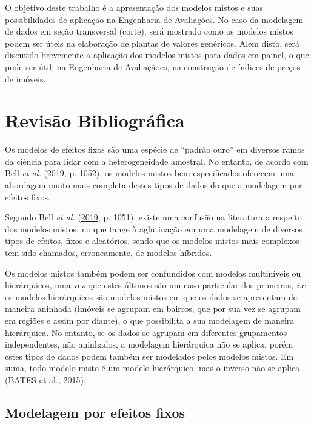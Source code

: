 \documentclass[
  a4paper, 11pt]{article}
\begin{document}
O objetivo deste trabalho é a apresentação dos modelos mistos e suas
possibilidades de aplicação na Engenharia de Avaliações. No caso da
modelagem de dados em seção transversal (corte), será mostrado como os
modelos mistos podem ser úteis na elaboração de plantas de valores
genéricos. Além disto, será discutido brevemente a aplicação dos modelos
mistos para dados em painel, o que pode ser útil, na Engenharia de
Avaliaçãoes, na construção de índices de preços de imóveis.

\hypertarget{revisuxe3o-bibliogruxe1fica}{%
\section{Revisão Bibliográfica}\label{revisuxe3o-bibliogruxe1fica}}

Os modelos de efeitos fixos são uma espécie de ``padrão ouro'' em
diversos ramos da ciência para lidar com a heterogeneidade amostral. No
entanto, de acordo com Bell \emph{et al.}
(\protect\hyperlink{ref-bell2019}{2019}, p. 1052), os modelos mistos bem
especificados oferecem uma abordagem muito mais completa destes tipos de
dados do que a modelagem por efeitos fixos.

Segundo Bell \emph{et al.} (\protect\hyperlink{ref-bell2019}{2019}, p.
1051), existe uma confusão na literatura a respeito dos modelos mistos,
no que tange à aglutinação em uma modelagem de diversos tipos de
efeitos, fixos e aleatórios, sendo que os modelos mistos mais complexos
tem sido chamados, erroneamente, de modelos híbridos.

Os modelos mistos também podem ser confundidos com modelos multiníveis
ou hierárquicos, uma vez que estes últimos são um caso particular dos
primeiros, \emph{i.e} os modelos hierárquicos são modelos mistos em que
os dados se apresentam de maneira aninhada (imóveis se agrupam em
bairros, que por sua vez se agrupam em regiões e assim por diante), o
que possibilita a sua modelagem de maneira hierárquica. No entanto, se
os dados se agrupam em diferentes grupamentos independentes, não
aninhados, a modelagem hierárquica não se aplica, porém estes tipos de
dados podem também ser modelados pelos modelos mistos. Em suma, todo
modelo misto é um modelo hierárquico, mas o inverso não se aplica (BATES
et al., \protect\hyperlink{ref-Bates}{2015}).

\hypertarget{modelagem-por-efeitos-fixos}{%
\subsection{Modelagem por efeitos
fixos}\label{modelagem-por-efeitos-fixos}}
\end{document}
